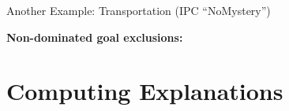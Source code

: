 \begin{frame}{Another Example: Transportation (IPC ``NoMystery'')}
\bigskip \pause

\textbf{Non-dominated goal exclusions:} 

\pause \prehandout{\bigskip\bigskip\bigskip\bigskip\bigskip\bigskip} 

\medskip

\end{frame}



%

\section[Computing]{Computing Explanations}
\subsection*{}

